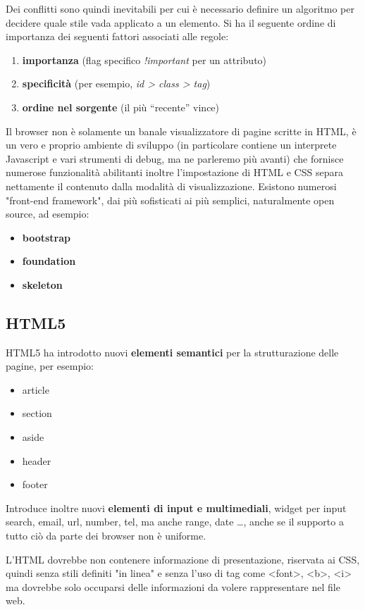 \message{ !name(sd.tex)}\documentclass[a4paper,12pt, oneside]{book}
\begin{document}
Dei conflitti sono quindi inevitabili per cui è necessario definire un algoritmo per decidere quale
stile vada applicato a un elemento.\newline
Si ha il seguente ordine di importanza dei seguenti fattori associati alle regole:
\begin{enumerate}
	\item \textbf{importanza} (flag specifico \textit{!important} per un attributo)
	\item \textbf{specificità} (per esempio, \textit{id > class > tag})
	\item \textbf{ordine nel sorgente }(il più “recente” vince)
\end{enumerate}
Il browser non è solamente un banale visualizzatore di pagine scritte in HTML, è un vero e proprio 
ambiente di sviluppo (in particolare contiene un interprete Javascript e vari strumenti di debug,
ma ne parleremo più avanti) che fornisce numerose funzionalità abilitanti inoltre l'impostazione di
HTML e CSS separa nettamente il contenuto dalla modalità di visualizzazione.\newline
Esistono numerosi "front-end framework", dai più sofisticati ai più semplici, naturalmente open source, ad esempio:
\begin{itemize}
	\item \textbf{bootstrap}
	\item \textbf{foundation}
	\item \textbf{skeleton}
\end{itemize}

\subsection{HTML5}
HTML5 ha introdotto nuovi \textbf{elementi semantici} per la strutturazione delle pagine, per esempio:
\begin{itemize}
	\item article
	\item section
	\item aside
	\item header
	\item footer
\end{itemize}
Introduce inoltre nuovi \textbf{elementi di input e multimediali}, widget per input search, email,
url, number, tel, ma anche range, date \dots,  anche se il supporto a tutto ciò da parte dei browser non è uniforme.

L’HTML dovrebbe non contenere informazione di presentazione, riservata ai CSS, 
quindi senza stili definiti "in linea" e senza l'uso di tag come <font>, <b>, <i> ma dovrebbe solo 
occuparsi delle informazioni da volere rappresentare nel file web.
\end{document}
